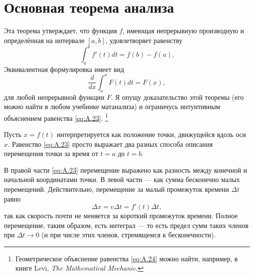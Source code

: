 \section{Основная теорема анализа}\label{Основная теорема анализа}

Эта теорема утверждает, что функция $f$, имеющая непрерывную производную и определённая на интервале $[a,b]$, удовлетворяет равенству
\begin{equation}
\int_a^b f'(t)dt=f(b)-f(a).
\label{eq:A.23}
\end{equation}
Эквивалентная формулировка имеет вид
\begin{equation}
\frac{d}{dx} \int_a^x F(t)dt=F(x),
\label{eq:A.24}
\end{equation}
для любой непрерывной функции $F$.
Я опущу доказательство этой теоремы (его можно найти в любом учебнике матанализа) и ограничусь интуитивным объяснением равенства \eqref{eq:A.23}.%
\footnote{Геометрическое объяснение равенства \eqref{eq:A.24} можно найти, например, в книге Levi, \emph{The Mathematical Mechanic}.}

Пусть $x=f(t)$ интерпретируется как положение точки, движущейся вдоль оси $x$.
Равенство \eqref{eq:A.23} просто выражает два разных способа описания перемещения точки за время от $t=a$ до $t=b$.

В правой части \eqref{eq:A.23} перемещение выражено как разность между конечной и начальной координатами точки.
В левой части --- как сумма бесконечно малых перемещений.
Действительно, перемещение за малый промежуток времени $\Delta t$ равно
\[\Delta x=v\Delta t=f'(t)\Delta t,\]
так как скорость почти не меняется за короткий промежуток времени.
Полное перемещение, таким образом, есть интеграл --- то есть предел сумм таких членов при $\Delta t\to0$ (и при числе этих членов, стремящемся к бесконечности).
